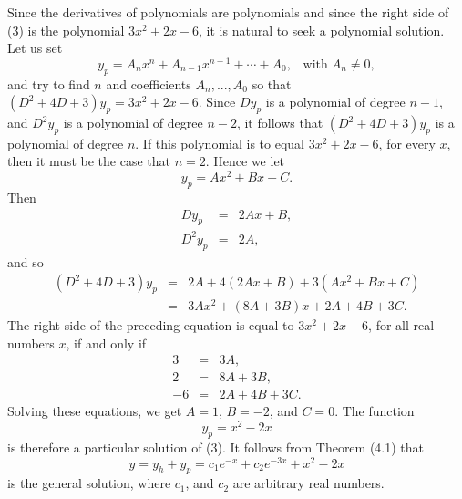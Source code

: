Since the derivatives of polynomials are polynomials and since the right side of (3) is the polynomial $3x^2 + 2x - 6$, it is natural to seek a polynomial solution. Let us set 
$$
y_p = A_nx^n + A_{n-1}x^{n-1} + \cdots + A_0,  \;\;\;\mbox{with}\; A_n \neq 0,
$$
and try to find $n$ and coefficients $A_n, . . ., A_0$ so that $(D^2 + 4D + 3)y_p = 3x^2 + 2x - 6$. Since $Dy_p$ is a polynomial of degree $n - 1$, and $D^2y_p$ is a polynomial of degree $n - 2$, it follows that $(D^2 + 4D + 3)y_p$ is a polynomial of degree $n$. If this polynomial is to equal $3x^2 + 2x - 6$, for every $x$, then it must be the case that $n = 2$. Hence we let
$$
y_p = Ax^2 + Bx + C.
$$
Then 
\begin{eqnarray*}
Dy_p &=& 2Ax + B, \\
D^2y_p &=& 2A, 
\end{eqnarray*}
and so
\begin{eqnarray*}
(D^2 + 4D + 3)y_p &=& 2A + 4(2Ax + B) + 3(Ax^2 + Bx + C)\\
                               &=& 3Ax^2 + (8A + 3B)x + 2A + 4B + 3C.
\end{eqnarray*}
The right side of the preceding equation is equal to $3x^2 + 2x - 6$, for all real numbers $x$, if and only if
\begin{eqnarray*}
3 &=& 3A, \\
2 &=& 8A + 3B,\\
-6 &=& 2A + 4B + 3C.
\end{eqnarray*}
Solving these equations, we get $A = 1$, $B = - 2$, and $C = 0$. The function 
$$
y_p= x^2 - 2x 
$$
is therefore a particular solution of (3). It follows from Theorem (4.1) that 
$$
y = y_h + y_p = c_1e^{-x} + c_2 e^{-3x} + x^2 - 2x
$$
is the general solution, where $c_1$, and $c_2$ are arbitrary real numbers.

